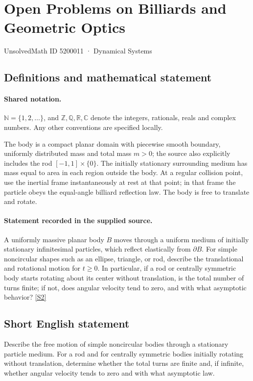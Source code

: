 \documentclass[11pt]{article}
\newcommand{\sref}[2]{\hyperlink{source:#1:#2}{[S#2]}}
\begin{document}
\setcounter{section}{5200010}
\section{Open Problems on Billiards and Geometric Optics}\label{5200011}
{\small\sffamily UnsolvedMath ID 5200011 · Dynamical Systems}
\subsection{Definitions and mathematical statement}

\paragraph{Shared notation.}$\mathbb N=\{1,2,\ldots\}$, and $\mathbb Z,\mathbb Q,\mathbb R,\mathbb C$ denote the integers, rationals, reals and complex numbers. Any other conventions are specified locally.


The body is a compact planar domain with piecewise smooth boundary, uniformly distributed mass and total mass $m>0$; the source also explicitly includes the rod $[-1,1]\times\{0\}$. The initially stationary surrounding medium has mass equal to area in each region outside the body. At a regular collision point, use the inertial frame instantaneously at rest at that point; in that frame the particle obeys the equal-angle billiard reflection law. The body is free to translate and rotate.
\paragraph{Statement recorded in the supplied source.}
A uniformly massive planar body $B$ moves through a uniform medium of initially stationary infinitesimal particles, which reflect elastically from $\partial B$. For simple noncircular shapes such as an ellipse, triangle, or rod, describe the translational and rotational motion for $t\geq0$. In particular, if a rod or centrally symmetric body starts rotating about its center without translation, is the total number of turns finite; if not, does angular velocity tend to zero, and with what asymptotic behavior? \sref{5200011}{2}
\subsection{Short English statement}
Describe the free motion of simple noncircular bodies through a stationary particle medium. For a rod and for centrally symmetric bodies initially rotating without translation, determine whether the total turns are finite and, if infinite, whether angular velocity tends to zero and with what asymptotic law.
\end{document}
